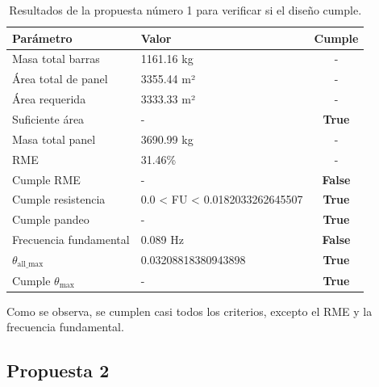 \begin{table}[H]
    \centering
    \begin{tabular}{|l|l|c|}
    \hline
    \textbf{Parámetro}              & \textbf{Valor}                     & \textbf{Cumple} \\ \hline
    Masa total barras               & 1161.16 kg                         & -               \\ \hline
    Área total de panel             & 3355.44 m²                         & -               \\ \hline
    Área requerida                  & 3333.33 m²                         & -               \\ \hline
    Suficiente área                 & -                                   & \textbf{True}   \\ \hline
    Masa total panel                & 3690.99 kg                         & -               \\ \hline
    RME                             & 31.46\%                            & -               \\ \hline
    Cumple RME                      & -                                   & \textbf{False}  \\ \hline
    Cumple resistencia              & 0.0 < FU < 0.0182033262645507      & \textbf{True}   \\ \hline
    Cumple pandeo                   & -                                   & \textbf{True}   \\ \hline
    Frecuencia fundamental          & 0.089 Hz                           & \textbf{False}  \\ \hline
    $\theta_\text{all\_max}$        & 0.03208818380943898                & \textbf{True}   \\ \hline
    Cumple $\theta_\text{max}$      & -                                   & \textbf{True}   \\ \hline
    \end{tabular}
    \caption{Resultados de la propuesta número 1 para verificar si el diseño cumple.}
    \label{tabla:modelo_h5_p1}
\end{table}
    
Como se observa, se cumplen casi todos los criterios, excepto el RME y la frecuencia fundamental.

\newpage
\subsection{Propuesta 2}

